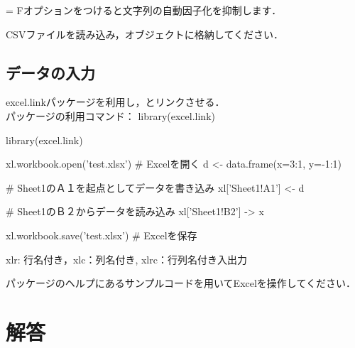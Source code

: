 \documentclass[../main]{subfiles}
\begin{document}
 = Fオプションをつけると文字列の自動因子化を抑制します．

\begin{exercise}
  CSVファイルを読み込み，オブジェクトに格納してください．
\tcblower
\end{exercise}

\subsection{\Excel データの入力}

{
  excel.linkパッケージを利用し，\R とリンクさせる．\\
  パッケージの利用コマンド： library(excel.link)
}

\begin{exercise}
  \begin{ConsoleR}
  library(excel.link)

  xl.workbook.open('test.xlsx') # Excelを開く
  d <- data.frame(x=3:1, y=-1:1)

  # Sheet1のＡ１を起点としてデータを書き込み
  xl['Sheet1!A1'] <- d

  # Sheet1のＢ２からデータを読み込み
  xl['Sheet1!B2'] -> x

  xl.workbook.save('test.xlsx') # Excelを保存
  \end{ConsoleR}
\tcblower
\end{exercise}

xlr: 行名付き，xlc：列名付き, xlrc：行列名付き入出力

\begin{exercise}
  パッケージのヘルプにあるサンプルコードを用いてExcelを操作してください．
\tcblower
\end{exercise}

\tcbstoprecording
\section{解答}
\tcbinputrecords
\end{document}
